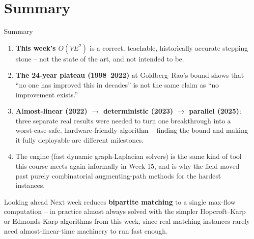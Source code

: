 \documentclass[11pt,aspectratio=169]{beamer}
\begin{document}
\section{Summary}

\begin{frame}{Summary}
  \footnotesize
  \begin{enumerate}
    \item \textbf{This week's $O(VE^2)$} is a correct, teachable, historically accurate
    stepping stone -- not the state of the art, and not intended to be.
    \item \textbf{The 24-year plateau (1998--2022)} at Goldberg--Rao's bound shows that
    ``no one has improved this in decades'' is not the same claim as ``no improvement
    exists.''
    \item \textbf{Almost-linear (2022) $\to$ deterministic (2023) $\to$ parallel
    (2025)}: three separate real results were needed to turn one breakthrough into a
    worst-case-safe, hardware-friendly algorithm -- finding the bound and making it
    fully deployable are different milestones.
    \item The engine (fast dynamic graph-Laplacian solvers) is the same kind of tool
    this course meets again informally in Week 15, and is why the field moved past
    purely combinatorial augmenting-path methods for the hardest instances.
  \end{enumerate}
  \begin{alertblock}{Looking ahead}
    Next week reduces \textbf{bipartite matching} to a single max-flow computation --
    in practice almost always solved with the simpler Hopcroft--Karp or Edmonds-Karp
    algorithms from this week, since real matching instances rarely need
    almost-linear-time machinery to run fast enough.
  \end{alertblock}
\end{frame}
\end{document}
